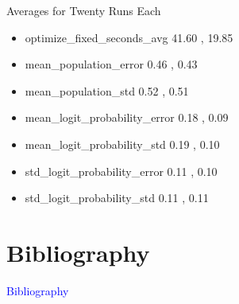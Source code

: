 \documentclass{beamer}
\newcommand{\Blue}[1]{\textcolor{blue}{#1}}
\newcommand{\Section}[1]{
	\section{#1}
	\begin{frame}
	\begin{center}
	\Blue{ \Large{#1} }
	\end{center}
	\end{frame}
}
\begin{document}
\begin{frame}{Averages for Twenty Runs Each}
\begin{itemize}

\item
optimize\_fixed\_seconds\_avg
\hspace{0.0em} 41.60 , 19.85
\pause

\item
mean\_population\_error
\hspace{2.35em} 0.46 , 0.43
\pause

\item
mean\_population\_std
\hspace{3.05em} 0.52 , 0.51
\pause

\item
mean\_logit\_probability\_error
\hspace{0.2em} 0.18 , 0.09
\pause

\item
mean\_logit\_probability\_std
\hspace{0.9em} 0.19 , 0.10
\pause

\item
std\_logit\_probability\_error
\hspace{1.2em} 0.11 , 0.10
\pause

\item
std\_logit\_probability\_std
\hspace{1.85em} 0.11 , 0.11
\pause


\end{itemize}
\end{frame}

\Section{Bibliography}
%
{}

\end{document}
